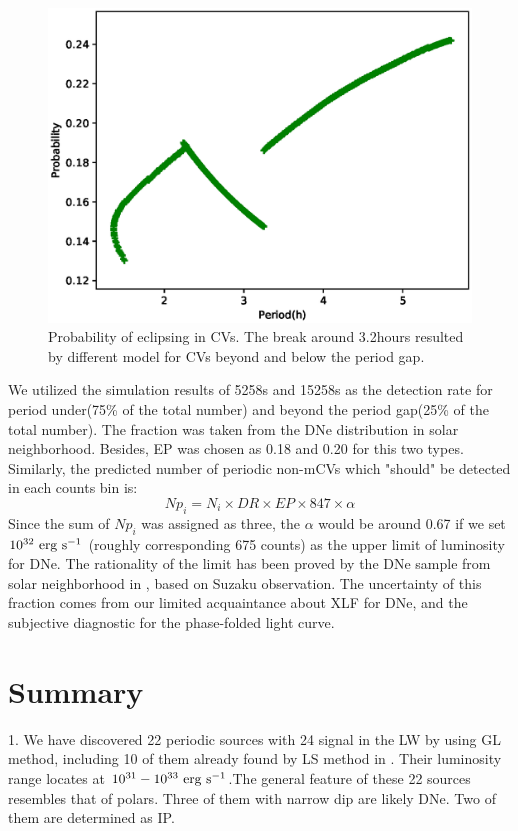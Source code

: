 \documentclass[twoside,twocolumn]{aastex63}
\begin{document}
\begin{figure}[ht!]
\centering
\includegraphics[scale=0.55]{./figure/p_inCV.eps}
\caption{Probability of eclipsing in CVs. The break around 3.2hours resulted by different model for CVs beyond and below the period gap.\label{fig:simpCV}}
\end{figure}
We utilized the simulation results of 5258s and 15258s as the detection rate for period under(75\% of the total number) and beyond the period gap(25\% of the total number). The fraction was taken from the DNe distribution in solar neighborhood. Besides, EP was chosen as 0.18 and 0.20 for this two types.
Similarly, the predicted number of periodic non-mCVs which "should" be detected in each counts bin is:
\begin{equation}
Np_{i}=N_i\times DR \times EP \times 847 \times \alpha	
\end{equation}
Since the sum of $Np_{i}$ was assigned as three, the $\alpha$ would be around 0.67 if we set $\rm 10^{32}~erg~s^{-1}$ (roughly corresponding 675 counts) as the upper limit of luminosity for DNe. The rationality of the limit has been proved by the DNe sample from solar neighborhood in \citep{2016ApJ...818..136X}, based on Suzaku observation. The uncertainty of this fraction comes from our limited acquaintance about XLF for DNe, and the subjective diagnostic for the phase-folded light curve. 
\section{Summary}\label{sec:summary}

1. We have discovered 22 periodic sources with 24 signal in the LW by using GL method, including 10 of them already found by LS method in \cite{2012ApJ...746..165H}. Their luminosity range locates at $\rm 10^{31}-10^{33}~erg~s^{-1} $.The general feature of these 22 sources resembles that of polars. Three of them with narrow dip are likely DNe. Two of them are determined as IP.
\end{document}
